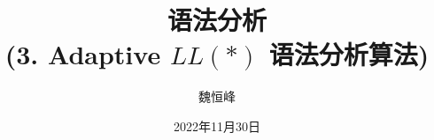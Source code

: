 \documentclass[]{beamer}
\title[语法分析]{语法分析 \\ (3. Adaptive $LL(\ast)$ 语法分析算法)}
\author[魏恒峰]{\large 魏恒峰}
\institute{hfwei@nju.edu.cn}
\date{2022年11月30日}
\begin{document}
\maketitle






\thankyou{}

\end{document}
